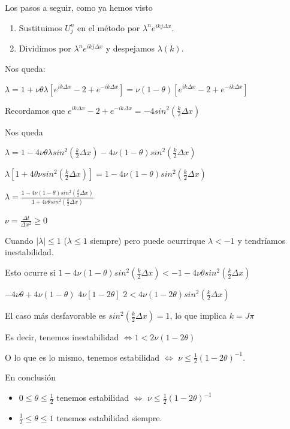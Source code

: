 Los pasos a seguir, como ya hemos visto
\begin{enumerate}
	\item Sustituimos $U_{j}^{n}$ en el método por $\lambda^n e^{ikj\Delta x}$.
	\item Dividimos por $\lambda^n e^{ikj\Delta x}$ y despejamos $\lambda(k)$.
\end{enumerate}

Nos queda:

\color{red}{DE AQUI HACIA ALANTE SE ESTÁ COMPLETANDO}

$\lambda = 1+ \nu\theta\lambda\left[e^{ik\Delta x}-2+e^{-ik\Delta x}\right] = \nu(1-\theta)\left[e^{ik\Delta x} - 2 + e^{-ik\Delta x}\right]$

Recordamos que
$e^{ik\Delta x}-2+e^{-ik\Delta x} = -4sin^2(\frac{k}{2}\Delta x)$ 

Nos queda

$\lambda = 1-4\nu\theta\lambda sin^2(\frac{k}{2}\Delta x)-4\nu(1-\theta)sin^2(\frac{k}{2}\Delta x)$

$\lambda\left[1+4\theta\nu sin^2(\frac{k}{2}\Delta x) \right] = 1 - 4\nu(1-\theta)sin^2(\frac{k}{2}\Delta x)$

$\lambda = \frac{1-4\nu(1-\theta)sin^2(\frac{k}{2}\Delta x)}{1+4\nu\theta sin^2(\frac{k}{2}\Delta x)}$

$\nu = \frac{\Delta t}{\Delta x ^ 2} \ge 0$

Cuando $|\lambda|\le 1$ ($\lambda \le 1$ siempre) pero puede ocurrirque $\lambda < -1$ y tendríamos inestabilidad.

Esto ocurre si $1-4\nu(1-\theta)sin^2(\frac{k}{2}\Delta x) < -1-4\nu\theta sin^2(\frac{k}{2}\Delta x)$

$-4\nu\theta +4\nu(1-\theta)$
$4\nu\left[1 -2\theta\right]$
$2 < 4\nu(1-2\theta)sin^2(\frac{k}{2}\Delta x)$


El caso más desfavorable es $sin^2(\frac{k}{2}\Delta x) = 1$, lo que implica $k=J\pi$

Es decir, tenemos inestabilidad $\iff 1 < 2\nu(1-2\theta)$

O lo que es lo mismo, tenemos estabilidad $\iff$ $\nu\le \frac{1}{2}(1-2\theta)^{-1}$.

En conclusión
\begin{itemize}
	\item $0\le\theta\le\frac{1}{2}$
	tenemos estabilidad $\iff$ $\nu\le\frac{1}{2}(1-2\theta)^{-1}$
	\item $\frac{1}{2}\le \theta \le 1$ 
	tenemos estabilidad siempre.
\end{itemize}

